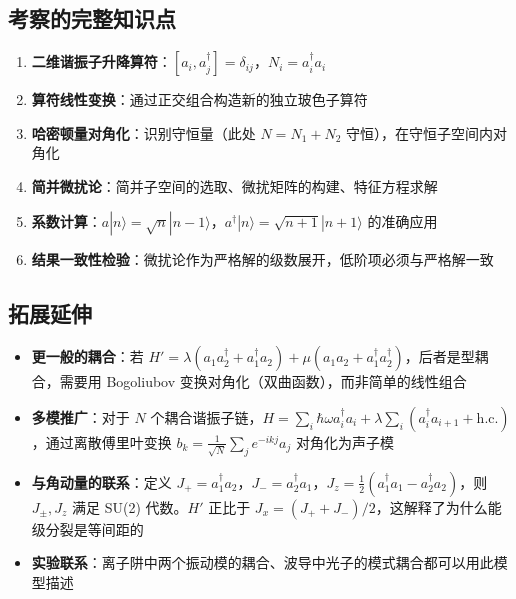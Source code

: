 \subsection{考察的完整知识点}

\begin{enumerate}
    \item \textbf{二维谐振子升降算符}：$[a_i, a_j^\dagger] = \delta_{ij}$，$N_i = a_i^\dagger a_i$
    \item \textbf{算符线性变换}：通过正交组合构造新的独立玻色子算符
    \item \textbf{哈密顿量对角化}：识别守恒量（此处 $N = N_1+N_2$ 守恒），在守恒子空间内对角化
    \item \textbf{简并微扰论}：简并子空间的选取、微扰矩阵的构建、特征方程求解
    \item \textbf{系数计算}：$a|n\rangle = \sqrt{n}|n-1\rangle$，$a^\dagger|n\rangle = \sqrt{n+1}|n+1\rangle$ 的准确应用
    \item \textbf{结果一致性检验}：微扰论作为严格解的级数展开，低阶项必须与严格解一致
\end{enumerate}

\subsection{拓展延伸}

\begin{itemize}
    \item \textbf{更一般的耦合}：若 $H' = \lambda(a_1 a_2^\dagger + a_1^\dagger a_2) + \mu(a_1 a_2 + a_1^\dagger a_2^\dagger)$，后者是型耦合，需要用 Bogoliubov 变换对角化（双曲函数），而非简单的线性组合
    \item \textbf{多模推广}：对于 $N$ 个耦合谐振子链，$H = \sum_i \hbar\omega a_i^\dagger a_i + \lambda\sum_i (a_i^\dagger a_{i+1} + \text{h.c.})$，通过离散傅里叶变换 $b_k = \frac{1}{\sqrt{N}}\sum_j e^{-ikj} a_j$ 对角化为声子模
    \item \textbf{与角动量的联系}：定义 $J_+ = a_1^\dagger a_2$，$J_- = a_2^\dagger a_1$，$J_z = \frac{1}{2}(a_1^\dagger a_1 - a_2^\dagger a_2)$，则 $J_\pm, J_z$ 满足 SU(2) 代数。$H'$ 正比于 $J_x = (J_+ + J_-)/2$，这解释了为什么能级分裂是等间距的
    \item \textbf{实验联系}：离子阱中两个振动模的耦合、波导中光子的模式耦合都可以用此模型描述
\end{itemize}

\newpage

\newpage

\newpage

\newpage

\newpage

\newpage

\newpage

\newpage

\newpage

\newpage

\newpage

\newpage

\newpage

\newpage

\newpage

\newpage

\newpage

\newpage

\newpage

\newpage
